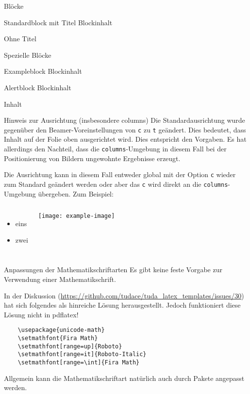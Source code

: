 \documentclass[
	ngerman,%
	aspectratio=169,%
	accentcolor=2d,%
	logo=false,%
	colorframetitle=true,%
	design=2008,  %
	]{tudabeamer}
\let\code\texttt
\begin{document}
\begin{frame}{Blöcke}
\begin{block}{Standardblock mit Titel}
	Blockinhalt
\end{block}
\begin{block}{}
	Ohne Titel
\end{block}
\end{frame}

\begin{frame}{Spezielle Blöcke}
\begin{exampleblock}{Exampleblock}
	Blockinhalt
\end{exampleblock}
\begin{alertblock}{Alertblock}
	Blockinhalt
\end{alertblock}
\begin{example}
	Inhalt
\end{example}
\end{frame}

\begin{frame}{Hinweis zur Ausrichtung (insbesondere columns)}
	Die Standardausrichtung wurde gegenüber den Beamer-Voreinstellungen von \code{c} zu \code{t} geändert. Dies bedeutet, dass Inhalt auf der Folie oben ausgerichtet wird. Dies entspricht den Vorgaben. Es hat allerdings den Nachteil, dass die \code{columns}-Umgebung in diesem Fall bei der Positionierung von Bildern ungewohnte Ergebnisse erzeugt.

	Die Ausrichtung kann in diesem Fall entweder global mit der Option \code{c} wieder zum Standard geändert werden oder aber das \code{c} wird direkt an die \code{columns}-Umgebung übergeben. Zum Beispiel:
\begin{columns}[onlytextwidth,c]%
	\begin{itemize}
		\item eins
		\item zwei
	\end{itemize}
	\texttt{[image: example-image]}
\end{columns}
\end{frame}


\begin{frame}[fragile]{Anpassungen der Mathematikschriftarten}
	Es gibt keine feste Vorgabe zur Verwendung einer Mathematikschrift.

	In der Diskussion (\url{https://github.com/tudace/tuda_latex_templates/issues/30}) hat sich folgendes als hinreiche Lösung herausgestellt. Jedoch funktioniert diese Lösung nicht in pdflatex!
	\begin{verbatim}
	\usepackage{unicode-math}
	\setmathfont{Fira Math}
	\setmathfont[range=up]{Roboto}
	\setmathfont[range=it]{Roboto-Italic}
	\setmathfont[range=\int]{Fira Math}
	\end{verbatim}
	Allgemein kann die Mathematikschriftart natürlich auch durch Pakete angepasst werden.
\end{frame}
\end{document}
